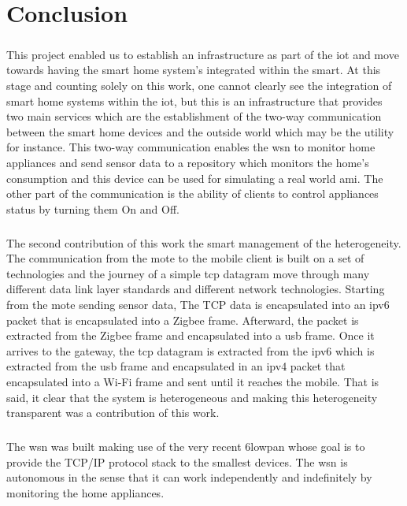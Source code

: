 \documentclass[oneside,12pt,a4paper,final]{book}
\begin{document}
\chapter{Conclusion}
\paragraph{}
This project enabled us to establish an infrastructure as part of the \gls{iot} and move towards having the smart home system's integrated within the smart. At this stage and counting solely on this work, one cannot clearly see the integration of smart home systems within the \gls{iot}, but this is an infrastructure that provides two main services which are the establishment of the two-way communication between the smart home devices and the outside world which may be the utility for instance. This two-way communication enables the \gls{wsn} to monitor home appliances and send sensor data to a repository which monitors the home's consumption and this device can be used for simulating a real world \gls{ami}. The other part of the communication is the ability of clients to control appliances status by turning them On and Off.
\paragraph{}
The second contribution of this work the smart management of the heterogeneity. The communication from the mote to the mobile client is built on a set of technologies and the journey of a simple \gls{tcp} datagram move through many different data link layer standards and different network technologies. Starting from the mote sending sensor data, The TCP data is encapsulated into an \gls{ipv6} packet that is encapsulated into a Zigbee frame. Afterward, the packet is extracted from the Zigbee frame and encapsulated into a \gls{usb} frame. Once it arrives to the gateway, the \gls{tcp} datagram is extracted from the \gls{ipv6} which is extracted from the \gls{usb} frame and encapsulated in an \gls{ipv4} packet that encapsulated into a Wi-Fi frame and sent until it reaches the mobile. That is said, it clear that the system is heterogeneous and making this heterogeneity transparent was a contribution of this work.
\paragraph{}
The \gls{wsn} was built making use of the very recent \gls{6lowpan} whose goal is to provide the TCP/IP protocol stack to the smallest devices. The \gls{wsn} is autonomous in the sense that it can work independently and indefinitely by monitoring the home appliances. 
\end{document}
